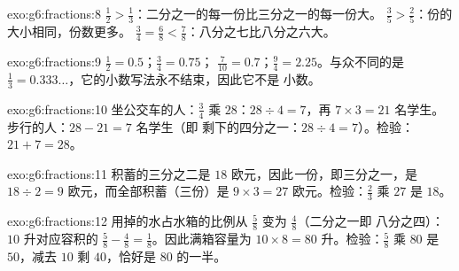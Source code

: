 \begin{solution}{exo:g6:fractions:8}
$\frac12 > \frac13$：二分之一的每一份比三分之一的每一份大。
$\frac35 > \frac25$：份的大小相同，份数更多。
$\frac34 = \frac68 < \frac78$：八分之七比八分之六大。
\end{solution}

\begin{solution}{exo:g6:fractions:9}
$\frac12 = 0.5$；\quad $\frac34 = 0.75$；\quad
$\frac{7}{10} = 0.7$；\quad $\frac94 = 2.25$。与众不同的是
$\frac13 = 0.333\dots$，它的小数写法永不结束，因此它不是
小数。
\end{solution}

\begin{solution}{exo:g6:fractions:10}
坐公交车的人：$\frac34$ 乘 $28$：$28 \div 4 = 7$，再
$7 \times 3 = 21$ 名学生。步行的人：$28 - 21 = 7$ 名学生（即
剩下的四分之一：$28 \div 4 = 7$）。检验：$21 + 7 = 28$。
\end{solution}

\begin{solution}{exo:g6:fractions:11}
积蓄的三分之二是 $18$ 欧元，因此\emph{一}份，即三分之一，是
$18 \div 2 = 9$ 欧元，而全部积蓄（三份）是
$9 \times 3 = 27$ 欧元。检验：$\frac23$ 乘 $27$ 是 $18$。
\end{solution}

\begin{solution}{exo:g6:fractions:12}
用掉的水占水箱的比例从 $\frac58$ 变为 $\frac48$（二分之一即
八分之四）：$10$ 升对应容积的
$\frac58 - \frac48 = \frac18$。因此满箱容量为
$10 \times 8 = 80$ 升。检验：$\frac58$ 乘 $80$ 是 $50$，减去
$10$ 剩 $40$，恰好是 $80$ 的一半。
\end{solution}

